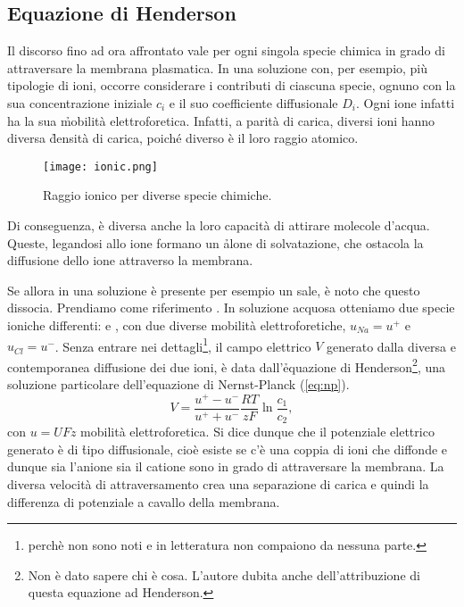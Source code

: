 \subsection{Equazione di Henderson}
Il discorso fino ad ora affrontato vale per ogni singola specie chimica in grado di attraversare la membrana plasmatica. In una soluzione con, per esempio, più tipologie di ioni, occorre considerare i contributi di ciascuna specie, ognuno con la sua concentrazione iniziale $c_i$ e il suo coefficiente diffusionale $D_i$. Ogni ione infatti ha la sua \h{mobilità elettroforetica}. Infatti, a parità di carica, diversi ioni hanno diversa \h{densità di carica}, poiché diverso è il loro raggio atomico.
\begin{figure}[h]
    \centering
    \texttt{[image: ionic.png]}
    \caption{Raggio ionico per diverse specie chimiche.}
    \label{fig:ionic}
\end{figure}
Di conseguenza, è diversa anche la loro capacità di attirare molecole d'acqua. Queste, legandosi allo ione formano un \h{alone di solvatazione}, che ostacola la diffusione dello ione attraverso la membrana.

Se allora in una soluzione è presente per esempio un sale, è noto che questo dissocia. Prendiamo come riferimento . In soluzione acquosa otteniamo due specie ioniche differenti:  e , con due diverse mobilità elettroforetiche, $u_{Na}=u^+$ e $u_{Cl}=u^-$. Senza entrare nei dettagli\footnote{perchè non sono noti e in letteratura non compaiono da nessuna parte.}, il campo elettrico $V$ generato dalla diversa e contemporanea diffusione dei due ioni, è data dall'\h{equazione di Henderson}\footnote{Non è dato sapere chi è cosa. L'autore dubita anche dell'attribuzione di questa equazione ad Henderson.}, una soluzione particolare dell'equazione di Nernst-Planck (\ref{eq:np}).
\begin{equation*}
    \boxed{
        V = \frac{u^+-u^-}{u^++u^-}\frac{RT}{zF}\ln{\frac{c_1}{c_2}},
    }
\end{equation*}
con $u = UFz$  mobilità elettroforetica. Si dice dunque che il potenziale elettrico generato è di \h{tipo diffusionale}, cioè esiste se c'è una coppia di ioni che diffonde e dunque sia l'anione sia il catione sono in grado di attraversare la membrana. La diversa velocità di attraversamento crea una separazione di carica e quindi la differenza di potenziale a cavallo della membrana.

